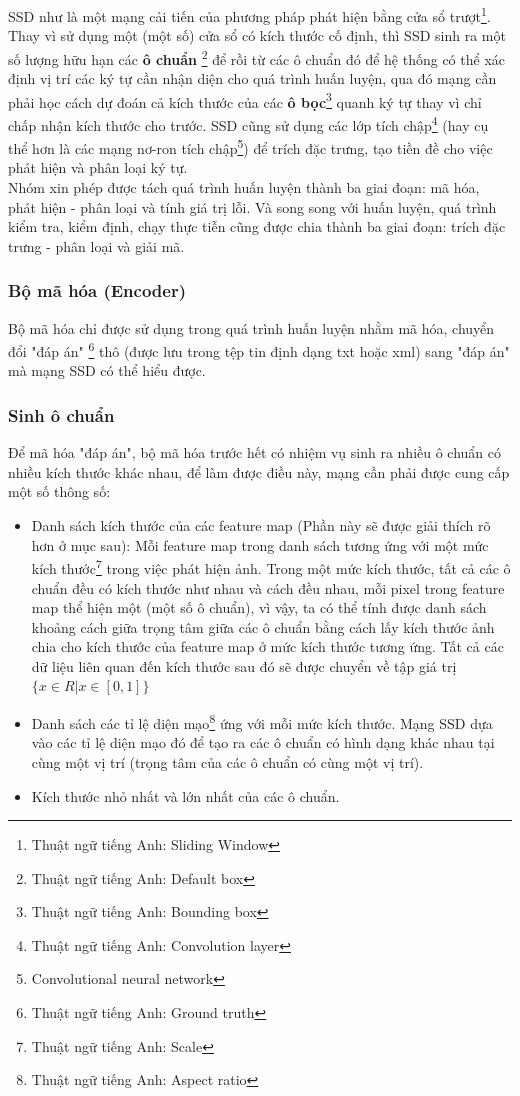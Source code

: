 \documentclass[a4paper,12pt]{article}
\begin{document}
	SSD như là một mạng cải tiến của phương pháp phát hiện bằng cửa sổ trượt\footnote{Thuật ngữ tiếng Anh: Sliding Window}. Thay vì sử dụng một (một số) cửa sổ có kích thước cố định, thì SSD sinh ra một số lượng hữu hạn các \textbf{ô chuẩn} \footnote{Thuật ngữ tiếng Anh: Default box} để rồi từ các ô chuẩn đó để hệ thống có thể xác định vị trí các ký tự cần nhận diện cho quá trình huấn luyện, qua đó mạng cần phải học cách dự đoán cả kích thước của các \textbf{ô bọc}\footnote{Thuật ngữ tiếng Anh: Bounding box} quanh ký tự thay vì chỉ chấp nhận kích thước cho trước. SSD cũng sử dụng các lớp tích chập\footnote{Thuật ngữ tiếng Anh: Convolution layer} (hay cụ thể hơn là các mạng nơ-ron tích chập\footnote{Convolutional neural network}) để trích đặc trưng, tạo tiền đề cho việc phát hiện và phân loại ký tự. \\
	
	Nhóm xin phép được tách quá trình huấn luyện thành ba giai đoạn: mã hóa, phát hiện - phân loại và tính giá trị lỗi. Và song song với huấn luyện, quá trình kiểm tra, kiểm định, chạy thực tiễn cũng được chia thành ba giai đoạn: trích đặc trưng - phân loại và giải mã.
	
	\subsubsection{Bộ mã hóa (Encoder)}
	Bộ mã hóa chỉ được sử dụng trong quá trình huấn luyện nhằm mã hóa, chuyển đổi "đáp án" \footnote{Thuật ngữ tiếng Anh: Ground truth} thô (được lưu trong tệp tin định dạng txt hoặc xml) sang "đáp án" mà mạng SSD\cite{liu2016ssd} có thể hiểu được.
	
	\subsubsection*{Sinh ô chuẩn}
	
	Để mã hóa "đáp án", bộ mã hóa trước hết có nhiệm vụ sinh ra nhiều ô chuẩn có nhiều kích thước khác nhau, để làm được điều này, mạng cần phải được cung cấp một số thông số:\\
	\begin{itemize}
		\item Danh sách kích thước của các feature map (Phần này sẽ được giải thích rõ hơn ở mục sau): Mỗi feature map trong danh sách tương ứng với một mức kích thước\footnote{Thuật ngữ tiếng Anh: Scale} trong việc phát hiện ảnh. Trong một mức kích thước, tất cả các ô chuẩn đều có kích thước như nhau và cách đều nhau, mỗi pixel trong feature map thể hiện một (một số ô chuẩn), vì vậy, ta có thể tính được danh sách khoảng cách giữa trọng tâm giữa các ô chuẩn bằng cách lấy kích thước ảnh chia cho kích thước của feature map ở mức kích thước tương ứng. Tất cả các dữ liệu liên quan đến kích thước sau đó sẽ được chuyển về tập giá trị $\{x \in R | x \in [0, 1] \} $ 
		\item Danh sách các tỉ lệ diện mạo\footnote{Thuật ngữ tiếng Anh: Aspect ratio} ứng với mỗi mức kích thước. Mạng SSD dựa vào các tỉ lệ diện mạo đó để tạo ra các ô chuẩn có hình dạng khác nhau tại cùng một vị trí (trọng tâm của các ô chuẩn có cùng một vị trí).
		\item Kích thước nhỏ nhất và lớn nhất của các ô chuẩn.
	\end{itemize} 
	
\end{document}
